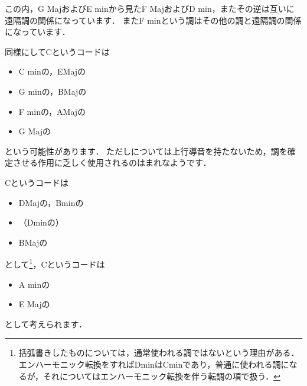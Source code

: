 \documentclass[dvipdfmx,uplatex,b5paper,openany,jbase=12Q,nomag*,textwidth-limit=44%
               ]{gachimuchi}[2020/05/05]
\begin{document}
この内，G MajおよびE minから見たF MajおよびD min，またその逆は互いに遠隔調の関係になっています．
またF minという調はその他の調と遠隔調の関係になっています．

同様にしてC\Min というコードは
\begin{itemize}
  \item C minの\Gni\Min ，E\aFlat Majの\Gnvi\Min
  \item G minの\Gniv\Min ，B\aFlat Majの\Gnii\Min
  \item F minの\Gnv\Min ，A\aFlat Majの\Gniii\Min
  \item G Majの\Gniv\Min
\end{itemize}
という可能性があります．
ただし\Gnv\Min については上行導音を持たないため，調を確定させる作用に乏しく使用されるのはまれなようです．

C\Dimt というコードは
\begin{itemize}
  \item D\aFlat Majの\Gnvii\Dimt ，B\aFlat minの\Gnii\Dimt
  \item \<（D\aFlat minの\Gnvii\Dimt）
  \item B\aFlat Majの\Gnii\Dimt
\end{itemize}
として\footnote{%
括弧書きしたものについては，通常使われる調ではないという理由がある．
エンハーモニック転換をすればD\aFlat minはC\aSharp minであり，普通に使われる調になるが，それについてはエンハーモニック転換を伴う転調の項で扱う．
}，C\Aug というコードは
\begin{itemize}
  \item A minの\Gniii\Aug
  \item E Majの\bFlat\Gnvi\Aug
\end{itemize}
として考えられます．
\end{document}
